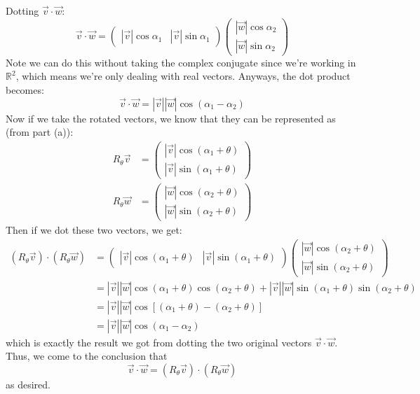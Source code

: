 \documentclass{article}
\begin{document}
\begin{itemize}
		\begin{solution}
			Dotting $\vec v \cdot \vec w$:
			\[
				\vec v \cdot \vec w = \begin{pmatrix} |\vec v| \cos \alpha_1 & |\vec v| \sin \alpha_1 
				\end{pmatrix} \begin{pmatrix} |\vec w| \cos \alpha_2 \\ |\vec w| \sin \alpha_2 \end{pmatrix} 
			\] 
			Note we can do this without taking the complex conjugate since we're working in $\mathbb R^2$, which 
			means we're only dealing with real vectors. Anyways, the dot product becomes: 
			\[
			\vec v \cdot \vec w = |\vec v| |\vec w| \cos (\alpha_1 - \alpha_2)
			\] 
			Now if we take the rotated vectors, we know that they can be represented as (from part (a)): 
			\begin{align*}
				R_{\theta} \vec v &= \begin{pmatrix} |\vec v| \cos(\alpha_1 + \theta) \\
				|\vec v| \sin(\alpha_1 + \theta)  \end{pmatrix} \\
					R_{\theta} \vec w &= \begin{pmatrix} |\vec w| \cos(\alpha_2 + \theta) \\ |\vec w| \sin (\alpha_2 + \theta)  \end{pmatrix} 
			\end{align*}
			Then if we dot these two vectors, we get: 
			\begin{align*}
				(R_\theta \vec v) \cdot (R_\theta \vec w) &=
				\begin{pmatrix} |\vec v| \cos(\alpha_1 + \theta) & |\vec v| \sin(\alpha_1 + \theta) \end{pmatrix}
				\begin{pmatrix} |\vec w| \cos(\alpha_2 + \theta) \\ |\vec w| \sin(\alpha_2 + \theta)  
				\end{pmatrix} \\
				&= |\vec v| |\vec w| \cos(\alpha_1 + \theta) \cos(\alpha_2 + \theta) + 
				|\vec v| |\vec w|\sin(\alpha_1 + \theta) \sin(\alpha_2 + \theta)   \\
				&= |\vec v| |\vec w| \cos\left[(\alpha_1 + \theta) - (\alpha_2 + \theta)\right] \\
				&= |\vec v| |\vec w| \cos(\alpha_1 - \alpha_2) 
			\end{align*} 
			which is exactly the result we got from dotting the two original vectors $\vec v \cdot \vec w$. 
			Thus, we come to the conclusion that 
			\[
			\vec v \cdot \vec w = (R_\theta \vec v) \cdot (R_\theta \vec w)
			\] 
			as desired. 
		\end{solution}
	\end{itemize}
\end{document}
